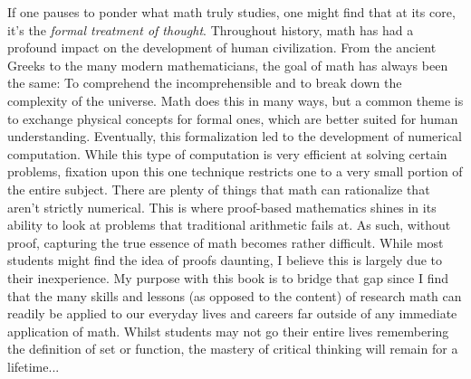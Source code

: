 If one pauses to ponder what math truly studies, one might find that at its core, it's the \textit{formal treatment of thought}.
Throughout history, math has had a profound impact on the development of human civilization.
From the ancient Greeks to the many modern mathematicians, the goal of math has always been the same: 
To comprehend the incomprehensible and to break down the complexity of the universe.
Math does this in many ways, but a common theme is to exchange physical concepts for formal ones, which are better suited for human understanding.
Eventually, this formalization led to the development of numerical computation.
While this type of computation is very efficient at solving certain problems, fixation upon this one technique restricts one to a very small portion of the entire subject.
There are plenty of things that math can rationalize that aren't strictly numerical.
This is where proof-based mathematics shines in its ability to look at problems that traditional arithmetic fails at.
As such, without proof, capturing the true essence of math becomes rather difficult.
While most students might find the idea of proofs daunting, I believe this is largely due to their inexperience.
My purpose with this book is to bridge that gap since I find that the many skills and lessons (as opposed to the content) of research math can readily be applied to our everyday lives and careers far outside of any immediate application of math.
Whilst students may not go their entire lives remembering the definition of set or function, the mastery of critical thinking will remain for a lifetime...


